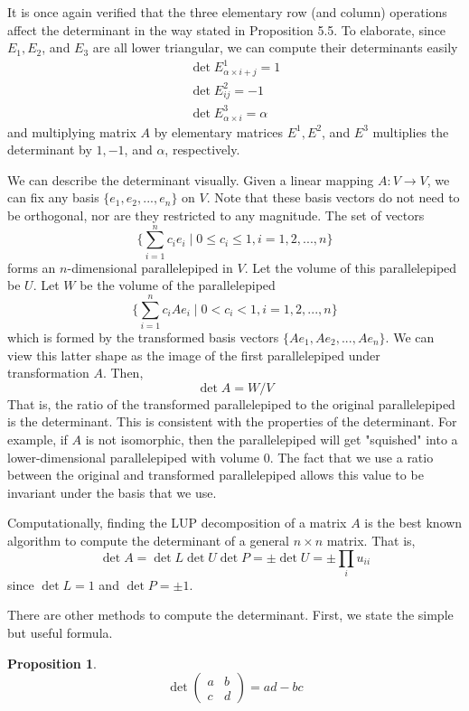 \documentclass{article}
\newtheorem{proposition}[theorem]{Proposition}
\theoremstyle{remark}
\theoremstyle{definition}
\begin{document}
  It is once again verified that the three elementary row (and column) operations affect the determinant in the way stated in Proposition 5.5. To elaborate, since $E_1, E_2$, and $E_3$ are all lower triangular, we can compute their determinants easily
  \begin{align*}
      \det{E^1_{\alpha \times i + j}} = 1 \\
      \det{E^2_{i j}} = -1 \\
      \det{E^3_{\alpha \times i}} = \alpha
  \end{align*}
  and multiplying matrix $A$ by elementary matrices $E^1, E^2$, and $E^3$ multiplies the determinant by $1, -1$, and $\alpha$, respectively. 

  We can describe the determinant visually. Given a linear mapping $A: V \longrightarrow V$, we can fix any basis $\{e_1, e_2, ..., e_n\}$ on $V$. Note that these basis vectors do not need to be orthogonal, nor are they restricted to any magnitude. The set of vectors 
  \[\Big\{ \sum_{i=1}^n c_i e_i \; | \; 0 \leq c_i \leq 1, i = 1, 2, ..., n\Big\}\]
  forms an $n$-dimensional parallelepiped in $V$. Let the volume of this parallelepiped be $U$. Let $W$ be the volume of the parallelepiped 
  \[\Big\{ \sum_{i=1}^n c_i A e_i \; | \; 0<c_i<1, i = 1, 2, ..., n\Big\}\]
  which is formed by the transformed basis vectors $\{Ae_1, Ae_2, ..., Ae_n\}$. We can view this latter shape as the image of the first parallelepiped under transformation $A$. Then, 
  \[ \det{A} = W / V \]
  That is, the ratio of the transformed parallelepiped to the original parallelepiped is the determinant. This is consistent with the properties of the determinant. For example, if $A$ is not isomorphic, then the parallelepiped will get "squished" into a lower-dimensional parallelepiped with volume $0$. The fact that we use a ratio between the original and transformed parallelepiped allows this value to be invariant under the basis that we use. 

  Computationally, finding the LUP decomposition of a matrix $A$ is the best known algorithm to compute the determinant of a general $n \times n$ matrix. That is, 
  \[ \det{A} = \det{L} \det{U} \det{P} = \pm \det{U} = \pm \prod_i u_{i i}\]
  since $\det{L} = 1$ and $\det{P} = \pm 1$. 

  There are other methods to compute the determinant. First, we state the simple but useful formula.

  \begin{proposition}
  \[\det{\begin{pmatrix}
  a&b\\c&d 
  \end{pmatrix}} = a d - b c\] 
  \end{proposition}
\end{document}
